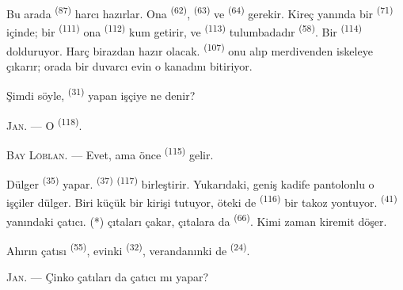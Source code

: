 Bu arada  \textsuperscript{(87)} harcı hazırlar. Ona
 \textsuperscript{(62)},  \textsuperscript{(63)} ve
 \textsuperscript{(64)} gerekir. Kireç yanında bir 
\textsuperscript{(71)} içinde; bir 
\textsuperscript{(111)} ona  \textsuperscript{(112)} kum
getirir, ve  \textsuperscript{(113)} tulumbadadır
\textsuperscript{(58)}. Bir  \textsuperscript{(114)} dolduruyor.
Harç birazdan hazır olacak.  \textsuperscript{(107)}
onu alıp merdivenden iskeleye çıkarır; orada bir duvarcı evin o kanadını
bitiriyor.

Şimdi söyle,  \textsuperscript{(31)} yapan işçiye ne denir?

\textsc{Jan}. --- O  \textsuperscript{(118)}.

\VUsaut{3.0mm}
\VUsaut{3.0mm}

\textsc{Bay Löblan}. --- Evet, ama önce 
\textsuperscript{(115)} gelir.

Dülger  \textsuperscript{(35)} yapar.
 \textsuperscript{(37)} 
\textsuperscript{(117)} birleştirir. Yukarıdaki, geniş kadife pantolonlu o
işçiler dülger. Biri küçük bir kirişi tutuyor, öteki de
 \textsuperscript{(116)} bir takoz yontuyor.
 \textsuperscript{(41)} yanındaki çatıcı.
 (*) çıtaları çakar, çıtalara da 
\textsuperscript{(66)}. Kimi zaman kiremit döşer.


Ahırın çatısı  \textsuperscript{(55)}, evinki
 \textsuperscript{(32)}, verandanınki de
 \textsuperscript{(24)}.

\textsc{Jan}. --- Çinko çatıları da çatıcı mı yapar?

